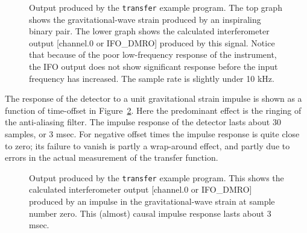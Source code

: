 \begin{figure}[hb]
\begin{center}
\caption{\label{f:detresp}
Output produced by the {\tt transfer} example program.
The top graph shows the gravitational-wave strain produced by an
inspiraling binary pair.  The lower graph shows the calculated
interferometer output [channel.0  or IFO\_DMRO] produced by this
signal.  Notice that because of the poor low-frequency response of the
instrument, the IFO output does not show significant response before
the input frequency has increased.  The sample rate is slightly under
10 kHz.
}
\end{center}
\end{figure}

The response of the detector to a unit gravitational strain impulse is
shown as a function of time-offset in Figure~\ref{f:detresp2}.  Here
the predominant effect is the ringing of the anti-aliasing filter.  The
impulse response of the detector lasts about 30 samples, or 3 msec.
For negative offset times the impulse response is quite close to zero;
its failure to vanish is partly a wrap-around effect, and partly due to
errors in the actual measurement of the transfer function.

\begin{figure}[hb]
\begin{center}
\caption{\label{f:detresp2}
Output produced by the {\tt transfer} example program.
This shows the calculated
interferometer output [channel.0  or IFO\_DMRO] produced by
an impulse in the gravitational-wave strain at sample number zero.
This (almost) causal impulse response lasts about 3 msec.
}
\end{center}
\end{figure}

